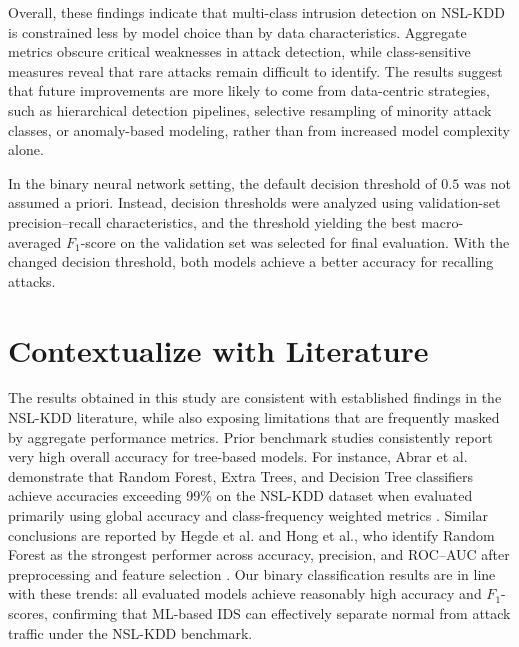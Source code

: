 Overall, these findings indicate that multi-class intrusion detection on NSL-KDD is constrained less by model choice than by data characteristics. Aggregate metrics 
obscure critical weaknesses in attack detection, while class-sensitive measures reveal that rare attacks remain difficult to identify. The results suggest that future 
improvements are more likely to come from data-centric strategies, such as hierarchical detection pipelines, selective resampling of minority attack classes, or anomaly-based modeling, rather than from increased model complexity alone.

In the binary neural network setting, the default decision threshold of $0.5$ was not assumed a priori. Instead, decision thresholds were analyzed using validation-set 
precision--recall characteristics, and the threshold yielding the best macro-averaged $F_{1}$-score on the validation set was selected for final evaluation. With the 
changed decision threshold, both models achieve a better accuracy for recalling attacks.

\section{Contextualize with Literature}

The results obtained in this study are consistent with established findings in the NSL-KDD literature, while also exposing limitations that are frequently masked by 
aggregate performance metrics. Prior benchmark studies consistently report very high overall accuracy for tree-based models. For instance, Abrar et al. demonstrate that 
Random Forest, Extra Trees, and Decision Tree classifiers achieve accuracies exceeding 99\% on the NSL-KDD dataset when evaluated primarily using global accuracy and 
class-frequency weighted metrics \cite{abrar2020machine}. Similar conclusions are reported by Hegde et al. and Hong et al., who identify Random Forest as the strongest 
performer across accuracy, precision, and ROC--AUC after preprocessing and feature selection \cite{hegde2024intrusion, hong2021machine}. Our binary classification results are in line with these trends: all evaluated models achieve reasonably high accuracy and $F_{1}$-scores, confirming that ML-based IDS can effectively separate normal from attack 
traffic under the NSL-KDD benchmark.

